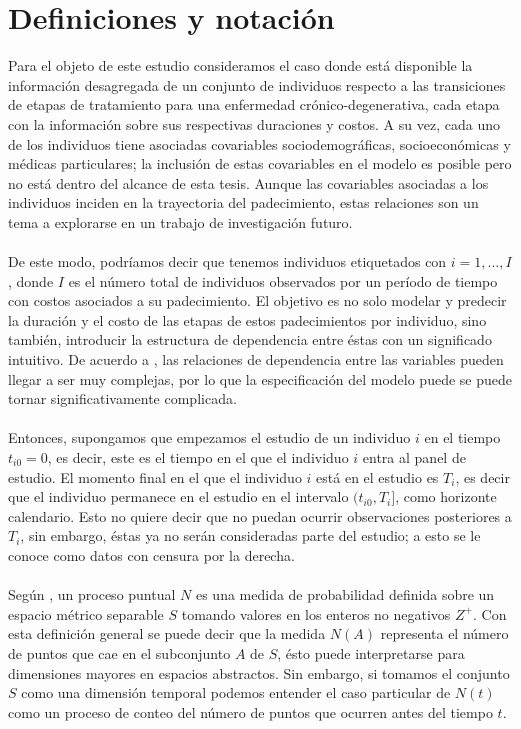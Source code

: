 \section{Definiciones y notaci\'on}
Para el objeto de este estudio consideramos el caso donde est\'a disponible la informaci\'on desagregada de un conjunto de individuos respecto a las transiciones de etapas de tratamiento para una enfermedad cr\'onico-degenerativa, cada etapa con la informaci\'on sobre sus respectivas  duraciones y costos. A su vez, cada uno de los individuos tiene asociadas covariables sociodemogr\'aficas, socioecon\'omicas y m\'edicas particulares; la inclusi\'on de estas covariables en el modelo es posible pero no est\'a dentro del alcance de esta tesis. Aunque las covariables asociadas a los individuos inciden en la trayectoria del padecimiento, estas relaciones son un tema a explorarse en un trabajo de investigaci\'on futuro.\\
\\
De este modo, podr\'iamos decir que tenemos individuos etiquetados con $i=1,...,I$, donde $I$ es el n\'umero total de individuos observados por un per\'iodo de tiempo con costos asociados a su padecimiento. El objetivo es no solo modelar y predecir la duraci\'on y el costo de las etapas de estos padecimientos por individuo, sino tambi\'en, introducir la estructura de dependencia entre \'estas con un significado intuitivo. De acuerdo a \cite{daley2003}, las relaciones de dependencia entre las variables pueden llegar a ser muy complejas, por lo que la especificaci\'on del modelo puede se puede tornar significativamente complicada.\\ 
\\
Entonces, supongamos que empezamos el estudio de un individuo $i$ en el tiempo $t_{i0}=0$, es decir, este es el tiempo en el que el individuo $i$ entra al panel de estudio. El momento final en el que el individuo $i$ est\'a en el estudio es $T_i$, es decir que el individuo permanece en el estudio en el intervalo $(t_{i0}, T_{i}]$, como horizonte calendario. Esto no quiere decir que no puedan ocurrir observaciones posteriores a $T_i$, sin embargo, \'estas ya no ser\'an consideradas parte del estudio; a esto se le conoce como datos con censura por la derecha.\\
\\
Seg\'un \cite{intropp}, un proceso puntual $N$ es una medida de probabilidad definida sobre un espacio m\'etrico separable $S$ tomando valores en los enteros no negativos $Z^+$. Con esta definici\'on general se puede decir que la medida $N(A)$ representa el n\'umero de puntos que cae en el subconjunto $A$ de $S$, \'esto puede interpretarse para dimensiones mayores en espacios abstractos. Sin embargo, si tomamos el conjunto $S$ como una dimensi\'on temporal podemos entender el caso particular de $N(t)$ como un proceso de conteo del n\'umero de puntos que ocurren antes del tiempo $t$.\\
